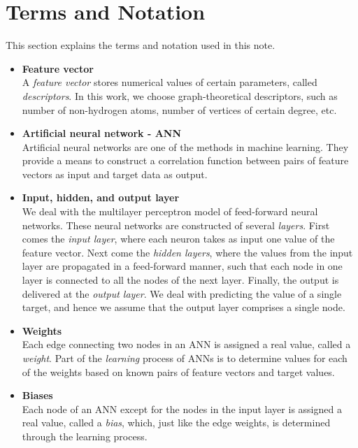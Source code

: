 \documentclass[11pt,titlepage,dvipdfmx,twoside]{book}
\begin{document}

\section{Terms and Notation}
\label{sec:Pre}
%
This section explains the terms and notation used in this note.


\begin{itemize}

\item {\bf Feature vector}\\
%
A {\em feature vector} stores numerical values of certain parameters,
called {\em descriptors}.
In this work, we choose graph-theoretical descriptors, such as number of 
non-hydrogen atoms, number of vertices of certain degree, etc.

\item {\bf Artificial neural network - ANN}\\
%
Artificial neural networks are one of the methods in machine learning.
They provide a means to construct a correlation function between 
pairs of feature vectors as input and target data as output.


\item {\bf Input, hidden, and output layer}\\
%
We deal with the multilayer perceptron model 
of feed-forward neural networks.
These neural networks are constructed of several {\em layers}.
First comes the \emph{input layer}, where each neuron takes as input
one value of the feature vector.
Next come the \emph{hidden layers}, where the 
values from the input layer are propagated in a feed-forward manner,
such that each node in one layer is connected to all the nodes of the next layer. 
Finally, the output is delivered at the \emph{output layer}.
We deal with predicting the value of a single target,
and hence we assume that the output layer comprises a single node.

\item {\bf Weights}\\
%
Each edge connecting two nodes in an ANN is assigned a real value,
called a \emph{weight}.
Part of the \emph{learning} process of ANNs is to determine values for each of the weights
based on known pairs of feature vectors and target values.

\item {\bf Biases}\\
Each node of an ANN except for the nodes in the input layer
is assigned a real value, called a {\em bias},
which, just like the edge weights, is determined through the learning process.



\end{itemize}
\end{document}
